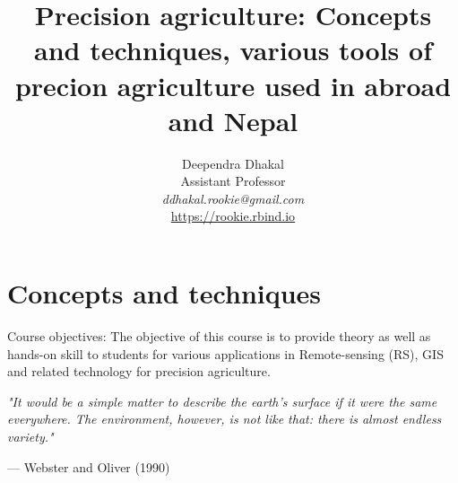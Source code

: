 \documentclass[11pt,dvipsnames,ignorenonframetext,aspectratio=169]{beamer}
\title[]{Precision agriculture: Concepts and techniques, various tools
of precion agriculture used in abroad and Nepal}
\author[
        Deependra Dhakal\\
Assistant Professor\\
\textit{ddhakal.rookie@gmail.com}\\
\url{https://rookie.rbind.io}
    ]{Deependra Dhakal\\
Assistant Professor\\
\textit{ddhakal.rookie@gmail.com}\\
\url{https://rookie.rbind.io}}
\date[
      
  ]{
    }
\begin{document}
  \begin{frame}[plain]
  \titlepage
  \end{frame}



\hypertarget{concepts-and-techniques}{%
\section{Concepts and techniques}\label{concepts-and-techniques}}

\begin{frame}{}
\protect\hypertarget{section}{}
\begin{alert}{Course objectives:}
The objective of this course is to provide theory as well as hands-on skill to students for various applications in Remote-sensing (RS), GIS and related technology for precision agriculture.
\end{alert}

\textit{"It would be a simple matter to describe the earth's surface if it were the same everywhere. The environment, however, is not like that: there is almost endless variety."}

\raggedleft --- Webster and Oliver (1990)
\end{frame}
\end{document}
